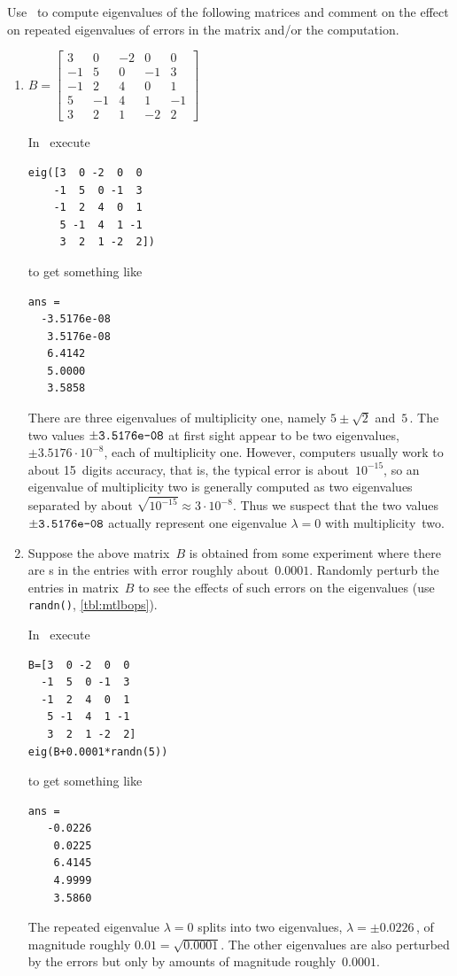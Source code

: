 \begin{example} 
Use \script\ to compute eigenvalues of the following matrices and comment on the effect on repeated eigenvalues of errors in the matrix and/or the computation.
\begin{enumerate}

\item \(B=\begin{bmatrix} 3&0&-2&0&0
\\-1&5&0&-1&3
\\-1&2&4&0&1
\\5&-1&4&1&-1
\\3&2&1&-2&2\end{bmatrix}\)
\begin{solution} 
In \script\ execute
\begin{verbatim}
eig([3  0 -2  0  0
    -1  5  0 -1  3
    -1  2  4  0  1
     5 -1  4  1 -1
     3  2  1 -2  2])
\end{verbatim}
\setbox\ajrqrbox\hbox{}%
\marginajrbox%
to get something like
\begin{verbatim}
ans =
  -3.5176e-08
   3.5176e-08
   6.4142
   5.0000
   3.5858
\end{verbatim}
There are three eigenvalues of multiplicity one, namely \(5\pm\sqrt2\) and~\(5\)\,.  
The two values \(\pm\verb|3.5176e-08|\) at first sight appear to be two eigenvalues, \(\pm3.5176\cdot10^{-8}\), each of multiplicity one.  
However, computers usually work to about 15~digits accuracy, that is, the typical error is about~\(10^{-15}\), so an eigenvalue of multiplicity two is generally computed as two eigenvalues separated by about \(\sqrt{10^{-15}}\approx3\cdot10^{-8}\).
Thus we suspect that the two values~\(\pm\verb|3.5176e-08|\) actually represent one eigenvalue \(\lambda=0\) with multiplicity~two.
\end{solution}


\item Suppose the above matrix~\(B\) is obtained from some experiment where there are s in the entries with error roughly about~\(0.0001\).
Randomly perturb the entries in matrix~\(B\) to see the effects of such errors on the eigenvalues (use \verb|randn()|, \cref{tbl:mtlbops}).
\begin{solution} 
In \script\ execute
\begin{verbatim}
B=[3  0 -2  0  0
  -1  5  0 -1  3
  -1  2  4  0  1
   5 -1  4  1 -1
   3  2  1 -2  2]
eig(B+0.0001*randn(5))
\end{verbatim}
\setbox\ajrqrbox\hbox{}%
\marginajrbox%
to get something like
\begin{verbatim}
ans =
   -0.0226
    0.0225
    6.4145
    4.9999
    3.5860
\end{verbatim}
The repeated eigenvalue \(\lambda=0\) splits into two eigenvalues, \(\lambda=\pm0.0226\)\,, of magnitude roughly \(0.01=\sqrt{0.0001}\).
The other eigenvalues are also perturbed by the errors but only by amounts of magnitude roughly~\(0.0001\).


\end{solution}
\end{enumerate}
\end{example}
